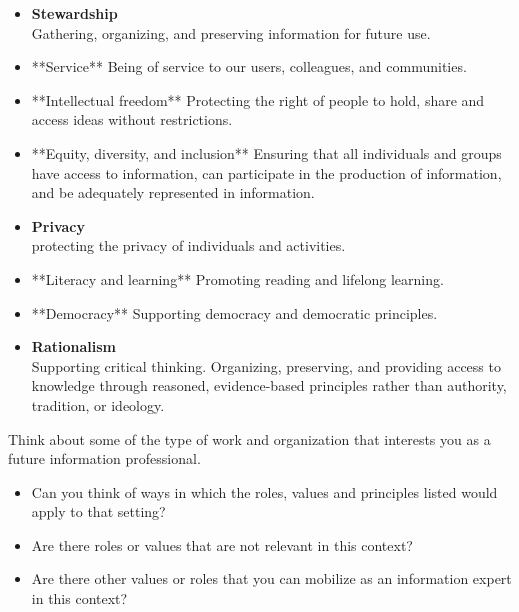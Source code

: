 \documentclass[
  letterpaper,
  DIV=11,
  numbers=noendperiod]{scrreprt}
\begin{document}
\begin{itemize}
\item
  \textbf{Stewardship}\\
  Gathering, organizing, and preserving information for future use.
\item
  **Service** Being of service to our users, colleagues, and
  communities.
\item
  **Intellectual freedom** Protecting the right of people to hold, share
  and access ideas without restrictions.
\item
  **Equity, diversity, and inclusion** Ensuring that all individuals and
  groups have access to information, can participate in the production
  of information, and be adequately represented in information.
\item
  \textbf{Privacy}\\
  protecting the privacy of individuals and activities.
\item
  **Literacy and learning** Promoting reading and lifelong learning.
\item
  **Democracy** Supporting democracy and democratic principles.
\item
  \textbf{Rationalism}\\
  Supporting critical thinking. Organizing, preserving, and providing
  access to knowledge through reasoned, evidence-based principles rather
  than authority, tradition, or ideology.
\end{itemize}

\begin{tcolorbox}[enhanced jigsaw, arc=.35mm, bottomrule=.15mm, bottomtitle=1mm, breakable, colback=white, colbacktitle=quarto-callout-tip-color!10!white, colframe=quarto-callout-tip-color-frame, coltitle=black, left=2mm, leftrule=.75mm, opacityback=0, opacitybacktitle=0.6, rightrule=.15mm, title=\textcolor{quarto-callout-tip-color}{\faLightbulb}\hspace{0.5em}{Things to think about}, titlerule=0mm, toprule=.15mm, toptitle=1mm]

Think about some of the type of work and organization that interests you
as a future information professional.

\begin{itemize}
\item
  Can you think of ways in which the roles, values and principles listed
  would apply to that setting?
\item
  Are there roles or values that are not relevant in this context?
\item
  Are there other values or roles that you can mobilize as an
  information expert in this context?
\end{itemize}

\end{tcolorbox}
\end{document}
